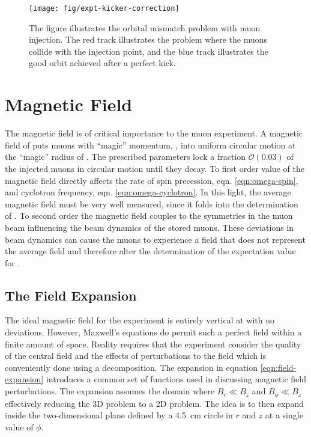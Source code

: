 \begin{figure}
\centering
\texttt{[image: fig/expt-kicker-correction]}
\caption{The figure illustrates the orbital mismatch problem with muon injection.  The red track illustrates the problem where the muons collide with the injection point, and the blue track illustrates the good orbit achieved after a perfect kick. \label{fig:expt-kicker-correction}}
\end{figure}

\section{Magnetic Field} \label{sec:magnetic-field}

The magnetic field is of critical importance to the muon \gmtwo experiment.  A magnetic field of \bmagic puts muons with ``magic'' momentum, \pmagic, into uniform circular motion at the ``magic'' radius of \rmagic.  The prescribed parameters lock a fraction $\mathcal{O}(0.03)$ of the injected muons in circular motion until they decay.  To first order value of the magnetic field directly affects the rate of spin precession, eqn. \ref{eqn:omega-spin}, and cyclotron frequency, eqn. \ref{eqn:omega-cyclotron}.  In this light, the average magnetic field must be very well measured, since it folds into the determination of \wa.  To second order the magnetic field couples to the symmetries in the muon beam influencing the beam dynamics of the stored muons.  These deviations in beam dynamics can cause the muons to experience a field that does not represent the average field and therefore alter the determination of the expectation value for \wa.

\subsection{The Field Expansion}

The ideal magnetic field for the experiment is entirely vertical at \bmagic with no deviations.  However, Maxwell's equations do permit such a perfect field within a finite amount of space.  Reality requires that the experiment consider the quality of the central field and the effects of perturbations to the field which is conveniently done using a decomposition.  The expansion in equation \ref{eqn:field-expansion} introduces a common set of functions used in discussing magnetic field perturbations.  The expansion assumes the domain where $B_r \ll B_z$ and $B_\phi \ll B_z$ effectively reducing the 3D problem to a 2D problem.  The idea is to then expand inside the two-dimensional plane defined by a \SI{4.5}{\cm} circle in $r$ and $z$ at a single value of $\phi$.

